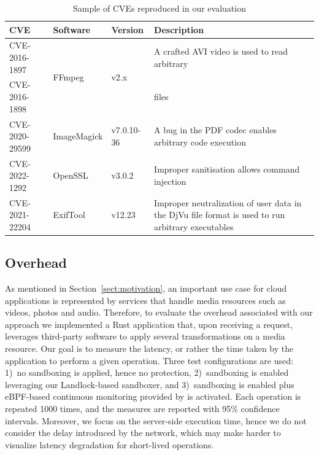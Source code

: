 \begin{table}[!t]
  \footnotesize
  \caption{\label{table:cve} Sample of CVEs reproduced in our evaluation}
  \setlength{\tabcolsep}{0.2cm}
  \begin{tabularx}{\columnwidth}{ l l l >{\raggedright\arraybackslash}X}
    \toprule
    {\bf CVE} & {\bf Software} & {\bf Version} & {\bf Description}\\
    \toprule
    CVE-2016-1897  & \multirow{2}{*}{FFmpeg} & \multirow{2}{*}{v2.x} & A crafted AVI video is used to read arbitrary \\
    CVE-2016-1898  & & & files \\
    \midrule
    CVE-2020-29599  & ImageMagick  & v7.0.10-36  & A bug in the PDF codec enables arbitrary code execution \\
    \midrule
    CVE-2022-1292  & OpenSSL  & v3.0.2 & Improper sanitisation allows command injection \\
    \midrule
    CVE-2021-22204   & ExifTool        &  v12.23 & Improper neutralization of user data in the DjVu file format is used to run arbitrary executables \\
    \bottomrule
  \end{tabularx}
\end{table}

\subsection{Overhead}\label{dmng:sect:exp-perf}

As mentioned in Section~\ref{sect:motivation}, an important use case
for cloud applications is represented by services that handle media
resources such as videos, photos and audio. Therefore, to evaluate the
overhead associated with our approach we implemented a Rust
application that, upon receiving a request, leverages third-party
software to apply several transformations on a media resource. Our
goal is to measure the latency, or rather the time taken by the
application to perform a given operation. Three test configurations
are used: 1)~no sandboxing is applied, hence no protection,
2)~sandboxing is enabled leveraging our Landlock-based sandboxer, and
3)~sandboxing is enabled plus eBPF-based continuous monitoring
provided by \dmng is activated. Each operation is repeated 1000 times,
and the measures are reported with 95\% confidence intervals. Moreover, we focus on the
server-side execution time, hence we do not consider the delay
introduced by the network, which may make harder to visualize latency
degradation for short-lived operations.

